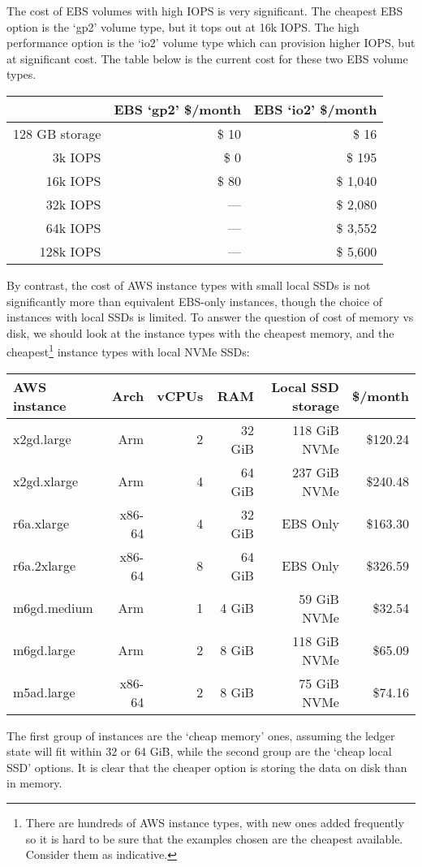 \documentclass[11pt,a4paper]{article}
\begin{document}
The cost of EBS volumes with high IOPS is very significant. The cheapest EBS
option is the `gp2' volume type, but it tops out at 16k IOPS. The high
performance option is the `io2' volume type which can provision higher IOPS,
but at significant cost. The table below is the current cost for these two
EBS volume types.
\begin{center}
\begin{tabular}[]{rrr}
           & EBS `gp2' \$/month & EBS `io2' \$/month \\
  \toprule
 128 GB storage & \$ 10 & \$ 16 \\
  \midrule
   3k IOPS & \$  0 & \$   195 \\
  16k IOPS & \$ 80 & \$ 1,040 \\
  32k IOPS & ---           & \$ 2,080 \\
  64k IOPS & ---           & \$ 3,552 \\
 128k IOPS & ---           & \$ 5,600 \\
\end{tabular}
\end{center}
By contrast, the cost of AWS instance types with small local SSDs is not
significantly more than equivalent EBS-only instances, though the choice of
instances with local SSDs is limited. To answer the question of cost of memory
vs disk, we should look at the instance types with the cheapest memory, and the
cheapest\footnote{There are hundreds of AWS instance types, with new ones added
frequently so it is hard to be sure that the examples chosen are the cheapest
available. Consider them as indicative.} instance types with local NVMe SSDs:
\begin{center}
\begin{tabular}[]{lrrrrr}
AWS instance & Arch & vCPUs & RAM & Local SSD storage & \$/month \\
\toprule
x2gd.large  & Arm    & 2 & 32 GiB & 118 GiB NVMe & \$120.24 \\
x2gd.xlarge & Arm    & 4 & 64 GiB & 237 GiB NVMe & \$240.48 \\
r6a.xlarge  & x86-64 & 4 & 32 GiB & EBS Only     & \$163.30 \\
r6a.2xlarge & x86-64 & 8 & 64 GiB & EBS Only     & \$326.59 \\
\midrule
m6gd.medium & Arm    & 1 &  4 GiB &  59 GiB NVMe & \$32.54 \\
m6gd.large  & Arm    & 2 &  8 GiB & 118 GiB NVMe & \$65.09 \\
m5ad.large  & x86-64 & 2 &  8 GiB &  75 GiB NVMe & \$74.16
\end{tabular}
\end{center}
The first group of instances are the `cheap memory' ones, assuming the ledger
state will fit within 32 or 64 GiB, while the second group are the `cheap local
SSD' options. It is clear that the cheaper option is storing the data on disk
than in memory.
\end{document}
